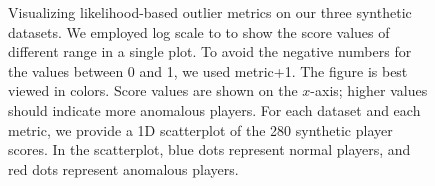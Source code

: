 						\begin{figure}
							\centering     %
							\caption{Visualizing likelihood-based outlier metrics on our three synthetic datasets. We employed log scale to to show the score values of different range in a single plot. To avoid the negative numbers for the values between 0 and 1, we used metric+1.  The figure is best viewed in colors. Score values are shown on the $x$-axis; higher values should indicate more anomalous players. For each dataset and each metric, we provide a 1D scatterplot of the 280 synthetic player scores. In the scatterplot, blue dots represent normal players, and red dots represent anomalous players. }\label{fig:1DPlots}
						\end{figure}
						
